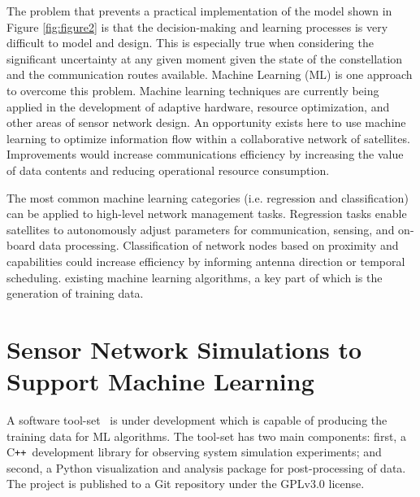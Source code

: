 \documentclass[conference]{IEEEtran}
\newcommand{\project}{{\sc{Collaborate}}~}
\newcommand{\cpp}{C\texttt{++}~}
\begin{document}
The problem that prevents a practical implementation of the model shown in
Figure \ref{fig:figure2} is that the decision-making and learning processes is
very difficult to model and design.  This is especially true when considering
the significant uncertainty at any given moment given the state of the
constellation and the communication routes available.  Machine Learning (ML) is
one approach to overcome this problem.  Machine learning techniques are
currently being applied in the development of adaptive hardware, resource
optimization, and other areas of sensor network design.  An opportunity exists
here to use machine learning to optimize information flow within a collaborative
network of satellites.  Improvements would increase communications efficiency by
increasing the value of data contents and reducing operational resource
consumption.

The most common machine learning categories (i.e. regression and classification)
can be applied to high-level network management tasks.  Regression tasks enable
satellites to autonomously adjust parameters for communication, sensing, and
on-board data processing.  Classification of network nodes based on proximity
and capabilities could increase efficiency by informing antenna direction or
temporal scheduling.  %
existing machine learning algorithms, a key part of which is the generation of
training data.

\section{Sensor Network Simulations to Support Machine Learning}
\label{sec:software}


A software tool-set \project is under development which is capable of producing
the training data for ML algorithms.  The tool-set has two main components:
first, a \cpp development library for observing system simulation experiments;
and second, a Python visualization and analysis package for post-processing of
data.  The project is published to a Git repository under the GPLv3.0 license.
\end{document}
